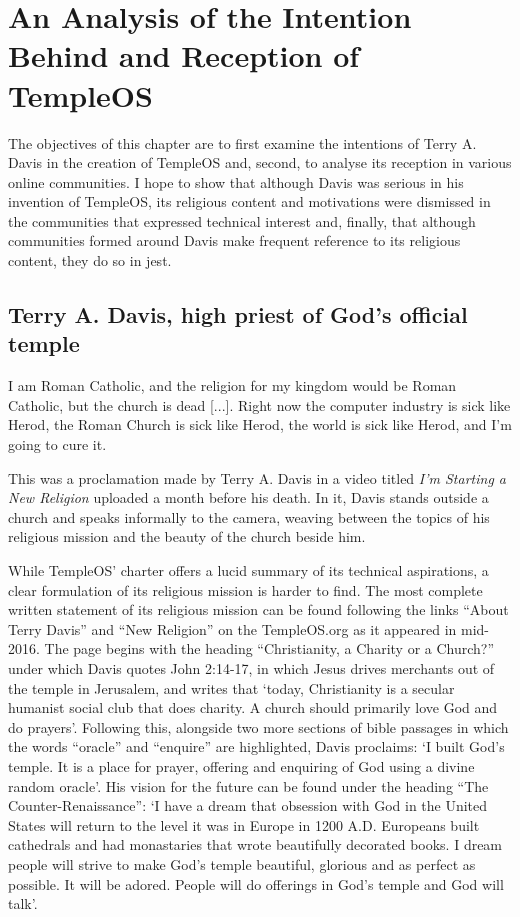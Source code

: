\documentclass[Draft.tex]{subfiles}
\begin{document}
\chapter{An Analysis of the Intention Behind and Reception of TempleOS}

The objectives of this chapter are to first examine
the intentions of Terry A. Davis in the creation of TempleOS and, second,
to analyse its reception in various online communities.
I hope to show that although Davis was serious in his invention of TempleOS,
its religious content and motivations were dismissed
in the communities that expressed technical interest and, finally,
that although communities formed around Davis make frequent reference
to its religious content, they do so in jest.

\section*{Terry A. Davis, high priest of God's official temple}

\begin{displayquote}
  I am Roman Catholic, and the religion for my kingdom
  would be Roman Catholic, but the church is dead [...].
  Right now the computer industry is sick like Herod,
  the Roman Church is sick like Herod,
  the world is sick like Herod, and I'm going to cure it.
\end{displayquote}

This was a proclamation made by Terry A. Davis \parencite*{NewReligionVid}
in a video titled \textit{I'm Starting a New Religion}
uploaded a month before his death.
In it, Davis stands outside a church and speaks informally to the camera,
weaving between the topics of his religious mission
and the beauty of the church beside him.

While TempleOS' charter offers a lucid summary of its technical aspirations,
a clear formulation of its religious mission is harder to find.
The most complete written statement of its religious mission can be found
following the links ``About Terry Davis'' and ``New Religion'' on the
TempleOS.org as it appeared in mid-2016.
The page begins with the heading ``Christianity, a Charity or a Church?''
under which Davis \parencite*{NewReligionSite} quotes John 2:14-17, in which
Jesus drives merchants out of the temple in Jerusalem,
and writes that `today, Christianity is a secular humanist social club
that does charity.  A church should primarily love God and do prayers'.
Following this, alongside two more sections of bible passages in which
the words ``oracle'' and ``enquire'' are highlighted,
Davis proclaims: `I built God's temple.  It is a place for prayer, offering and
enquiring of God using a divine random oracle'.
His vision for the future can be found under the heading
``The Counter-Renaissance'':
`I have a dream that obsession with God in the United States
will return to the level it was in Europe in 1200 A.D.
Europeans built cathedrals and had monastaries
that wrote beautifully decorated books.
I dream people will strive to make God's temple beautiful, glorious
and as perfect as possible.  It will be adored.
People will do offerings in God's temple and God will talk'.
\end{document}
